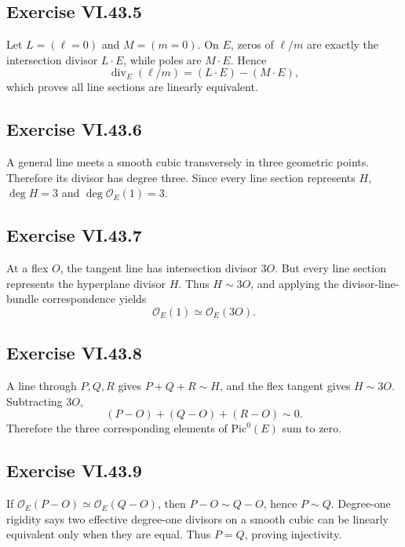 \subsection*{Exercise VI.43.5}
\begin{solution}
Let \(L=(\ell=0)\) and \(M=(m=0)\).  On \(E\), zeros of \(\ell/m\) are exactly the intersection divisor \(L\cdot E\), while poles are \(M\cdot E\).  Hence
\[
\operatorname{div}_E(\ell/m)=(L\cdot E)-(M\cdot E),
\]
which proves all line sections are linearly equivalent.
\end{solution}

\subsection*{Exercise VI.43.6}
\begin{solution}
A general line meets a smooth cubic transversely in three geometric points.  Therefore its divisor has degree three.  Since every line section represents \(H\), \(\deg H=3\) and \(\deg\mathcal O_E(1)=3\).
\end{solution}

\subsection*{Exercise VI.43.7}
\begin{solution}
At a flex \(O\), the tangent line has intersection divisor \(3O\).  But every line section represents the hyperplane divisor \(H\).  Thus \(H\sim3O\), and applying the divisor-line-bundle correspondence yields
\[
\mathcal O_E(1)\simeq\mathcal O_E(3O).
\]
\end{solution}

\subsection*{Exercise VI.43.8}
\begin{solution}
A line through \(P,Q,R\) gives \(P+Q+R\sim H\), and the flex tangent gives \(H\sim3O\).  Subtracting \(3O\),
\[
(P-O)+(Q-O)+(R-O)\sim0.
\]
Therefore the three corresponding elements of \(\mathrm{Pic}^0(E)\) sum to zero.
\end{solution}

\subsection*{Exercise VI.43.9}
\begin{solution}
If \(\mathcal O_E(P-O)\simeq\mathcal O_E(Q-O)\), then \(P-O\sim Q-O\), hence \(P\sim Q\).  Degree-one rigidity says two effective degree-one divisors on a smooth cubic can be linearly equivalent only when they are equal.  Thus \(P=Q\), proving injectivity.
\end{solution}

